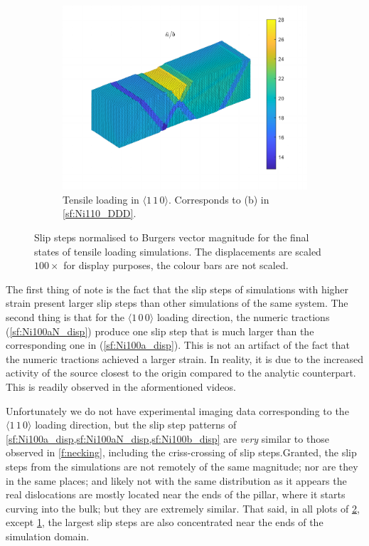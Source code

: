\begin{figure}
    \begin{subfigure}[t]{0.45\linewidth}
        \centering
        \includegraphics[width=\linewidth]{../data/16-Mar-2021_4_tensile_ni_110_225000_disp.pdf}
        \caption{Tensile loading in $\langle 1\, 1\, 0 \rangle$. Corresponds to (b) in \cref{sf:Ni110_DDD}.}
        \label{sf:Ni110b_disp}
    \end{subfigure}
    \caption[Slip steps normalised to Burgers vector magnitude for the final states of tensile loading simulations.]{Slip steps normalised to Burgers vector magnitude for the final states of tensile loading simulations. The displacements are scaled $100\times$ for display purposes, the colour bars are not scaled.}
    \label{f:slipSteps}
\end{figure}

The first thing of note is the fact that the slip steps of simulations with higher strain present larger slip steps than other simulations of the same system. The second thing is that for the $\langle 1\, 0\, 0 \rangle$ loading direction, the numeric tractions (\cref{sf:Ni100aN_disp}) produce one slip step that is much larger than the corresponding one in (\cref{sf:Ni100a_disp}). This is not an artifact of the fact that the numeric tractions achieved a larger strain. In reality, it is due to the increased activity of the source closest to the origin compared to the analytic counterpart. This is readily observed in the aformentioned videos.

Unfortunately we do not have experimental imaging data corresponding to the $\langle 1\, 1\, 0 \rangle$ loading direction, but the slip step patterns of \cref{sf:Ni100a_disp,sf:Ni100aN_disp,sf:Ni100b_disp} are \emph{very} similar to those observed in \cref{f:necking}, including the criss-crossing of slip steps.Granted, the slip steps from the simulations are not remotely of the same magnitude; nor are they in the same places; and likely not with the same distribution as it appears the real dislocations are mostly located near the ends of the pillar, where it starts curving into the bulk; but they are extremely similar. That said, in all plots of \cref{f:slipSteps}, except \cref{sf:Ni110b_disp}, the largest slip steps are also concentrated near the ends of the simulation domain.

